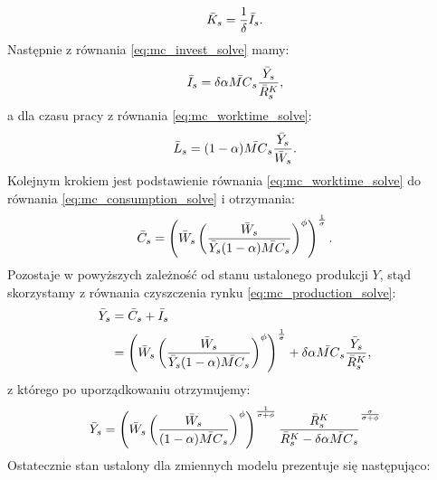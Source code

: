 \begin{equation}
    \bar{K}_s = \frac{1}{\delta} \bar{I}_s.
\end{equation}
Następnie z równania \eqref{eq:mc_invest_solve} mamy:
\begin{equation}
    \bar{I}_s = \delta \alpha \bar{MC}_s \frac{\bar{Y}_s}{\bar{R}_s^K},
\end{equation}
a dla czasu pracy z równania \eqref{eq:mc_worktime_solve}:
\begin{equation}
    \bar{L}_s = (1-\alpha)\bar{MC}_s\frac{\bar{Y}_s}{\bar{W}_s}.
\end{equation}
Kolejnym krokiem jest podstawienie równania \eqref{eq:mc_worktime_solve} do równania \eqref{eq:mc_consumption_solve} i otrzymania:
\begin{equation}
    \bar{C}_s = \left( \bar{W}_s \left( \frac{\bar{W}_s}{\bar{Y}_s(1-\alpha)\bar{MC}_s}\right)^\phi\right)^{\frac{1}{\sigma}}.
\end{equation}
Pozostaje w powyższych zależność od stanu ustalonego produkcji $Y$, stąd skorzystamy z równania czyszczenia rynku \eqref{eq:mc_production_solve}:
\begin{align}
    \bar{Y}_s &= \bar{C}_s + \bar{I}_s \\ 
    &= \left( \bar{W}_s \left( \frac{\bar{W}_s}{\bar{Y}_s(1-\alpha)\bar{MC}_s}\right)^\phi\right)^{\frac{1}{\sigma}} + \delta \alpha \bar{MC}_s \frac{\bar{Y}_s}{\bar{R}_s^K},
\end{align}
z którego po uporządkowaniu otrzymujemy:
\begin{equation}
    \bar{Y}_s = \left( \bar{W}_s \left( \frac{\bar{W}_s}{(1-\alpha)\bar{MC}_s}\right)^\phi\right)^{\frac{1}{\sigma + \phi}} \frac{\bar{R}_s^K}{\bar{R}_s^K - \delta \alpha \bar{MC}_s}^{\frac{\sigma}{\sigma + \phi}}
\end{equation}
Ostatecznie stan ustalony dla zmiennych modelu prezentuje się następująco:
